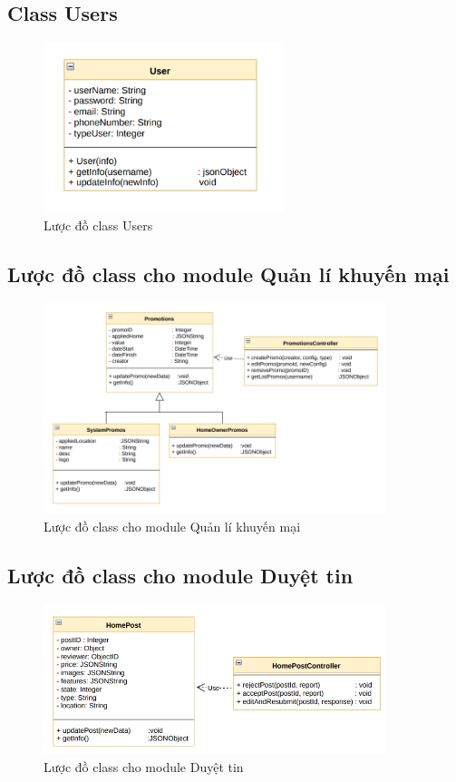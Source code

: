 \subsection{Class Users}
\begin{figure}[H]
	\centering
	\includegraphics[width=7cm]{Image/444.png}
	\vspace{0.5cm}
	\caption{Lược đồ class Users}
\end{figure}
\subsection{Lược đồ class cho module Quản lí khuyến mại}
\begin{figure}[H]
	\centering
	\includegraphics[width=10cm]{Image/555.png}
	\vspace{0.5cm}
	\caption{Lược đồ class cho module Quản lí khuyến mại}
\end{figure}
\subsection{Lược đồ class cho module Duyệt tin}
\begin{figure}[H]
	\centering
	\includegraphics[width=10cm]{Image/333.png}
	\vspace{0.5cm}
	\caption{Lược đồ class cho module Duyệt tin}
\end{figure}
